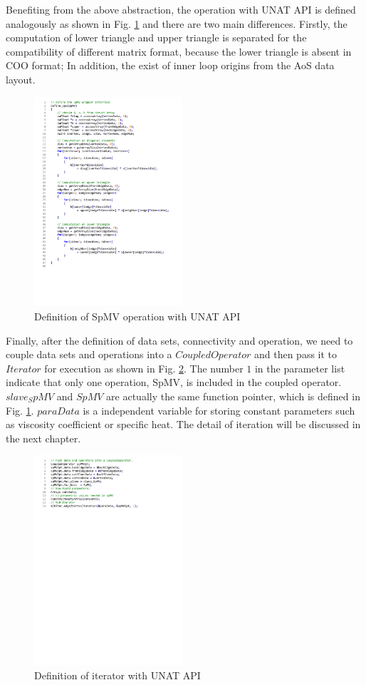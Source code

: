 \documentclass[5p,times]{elsarticle}
\begin{document}
Benefiting from the above abstraction, the operation with UNAT API is defined analogously as shown in Fig. \ref{spmv} and there are two main differences. Firstly, the computation of lower triangle and upper triangle is separated for the compatibility of different matrix format, because the lower triangle is absent in COO format; In addition, the exist of inner loop origins from the AoS data layout.
\begin{figure}[htb]
	\centerline{\includegraphics[width=0.49\textwidth]{spmv.pdf}}
	\caption{Definition of SpMV operation with UNAT API}
	\label{spmv}
\end{figure}

Finally, after the definition of data sets, connectivity and operation, we need to couple data sets and operations into a $CoupledOperator$ and then pass it to $Iterator$ for execution as shown in Fig. \ref{iteration}. The number $1$ in the parameter list indicate that only one operation, SpMV, is included in the coupled operator. $slave_SpMV$ and $SpMV$ are actually the same function pointer, which is defined in Fig. \ref{spmv}. $paraData$ is a independent variable for storing constant parameters such as viscosity coefficient or specific heat. The detail of iteration will be discussed in the next chapter.
\begin{figure}[htbp]
	\centerline{\includegraphics[width=0.49\textwidth]{iteration.pdf}}
	\caption{Definition of iterator with UNAT API}
	\label{iteration}
\end{figure}
\end{document}
